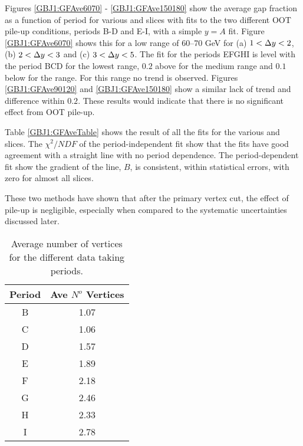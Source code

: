 Figures \ref{GBJ1:GFAve6070} - \ref{GBJ1:GFAve150180} show the average gap fraction as a function of period for various \dy{} and \ptb{} slices with fits to the two different OOT pile-up conditions, periods B-D and E-I, with a simple $y = A$ fit. 
Figure \ref{GBJ1:GFAve6070} shows this for a low \ptb{} range of 60--70 GeV for (a) $1<\mbox{$\Delta y$}{}<2$, (b) $2<\mbox{$\Delta y$}{}<3$ and (c) $3<\mbox{$\Delta y$}{}<5$.
The fit for the periods EFGHI is level with the period BCD for the lowest \dy{} range, $0.2$ above for the medium \dy{} range and $0.1$ below for the \dy{} range.
For this \ptb{} range no trend is observed.
Figures \ref{GBJ1:GFAve90120} and \ref{GBJ1:GFAve150180} show a similar lack of trend and difference within $0.2$.
These results would indicate that there is no significant effect from OOT pile-up. 


Table \ref{GBJ1:GFAveTable} shows the result of all the fits for the various \dy{} and \ptb{} slices. 
The $\chi^2/NDF$ of the period-independent fit show that the fits have good agreement with a straight line with no period dependence.
The period-dependent fit show the gradient of the line, $B$, is consistent, within statistical errors, with zero for almost all slices. 


These two methods have shown that after the primary vertex cut, the effect of pile-up is negligible, especially when compared to the systematic uncertainties discussed later. 
 
\begin{table}
\begin{center}
\begin{tabular}{|c|c|}
\hline
Period&Ave $N^o$ Vertices\\
\hline
B&1.07\\
C&1.06\\
D&1.57\\
E&1.89\\
F&2.18\\
G&2.46\\
H&2.33\\
I&2.78\\
\hline
\end{tabular}
\caption[Average number of primary vertices for different data periods]{ 
Average number of vertices for the different data taking periods.
\label{GBJ1:VertexAve}}
\end{center}
\end{table}

